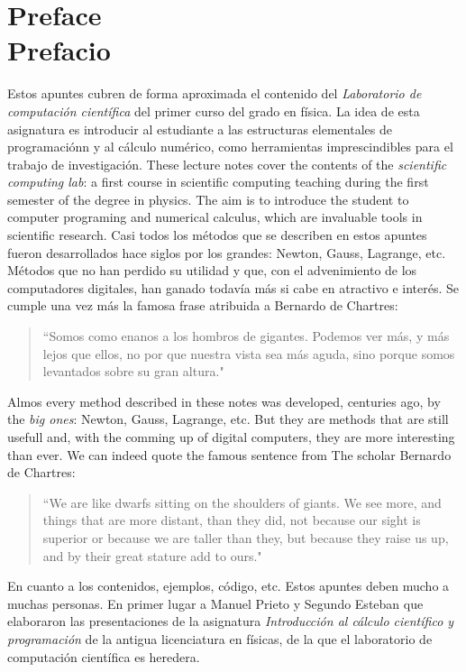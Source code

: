 \chapter*{Preface\\ Prefacio}
\begin{paracol}{2}
Estos apuntes cubren de forma aproximada  el contenido del \emph{Laboratorio de computación científica} del primer curso del grado en física.
La idea de esta asignatura es  introducir al estudiante a las estructuras elementales de programaciónn y al cálculo numérico, como herramientas imprescindibles para el trabajo de investigación.
\switchcolumn
These lecture notes cover the contents  of the \emph{scientific computing lab}: a first course in scientific computing teaching during the first semester of the degree in physics. The aim is to introduce the student to computer programing and numerical calculus, which are invaluable tools in scientific research.
\switchcolumn         
Casi todos los métodos que se describen en estos apuntes fueron desarrollados hace siglos por los grandes: Newton, Gauss, Lagrange, etc.  Métodos que no han perdido su utilidad y que, con el advenimiento de los computadores digitales, han ganado todavía más si cabe en atractivo e interés. Se cumple una vez más la famosa frase atribuida a Bernardo de Chartres:
\begin{quote}
``Somos como enanos a los hombros de gigantes. Podemos ver más, y más lejos que ellos, no por que nuestra vista sea más aguda, sino porque somos levantados sobre su gran altura."
\end{quote}
\switchcolumn
Almos every method described in these notes was developed, centuries ago, by the \emph{big ones}: Newton, Gauss, Lagrange, etc. But they are methods that are still usefull and, with the comming up of digital computers, they are more interesting than ever. We can indeed quote the famous sentence from The scholar Bernardo de Chartres:
\begin{quote}
``We are like dwarfs sitting on the shoulders of giants. We see more, and things that are more distant, than they did, not because our sight is superior or because we are taller than they, but because they raise us up, and by their great stature add to ours."
\end{quote}          

\switchcolumn
En cuanto a los contenidos, ejemplos, código, etc. Estos apuntes deben mucho a muchas personas. En primer lugar a Manuel Prieto y Segundo Esteban que elaboraron las presentaciones de la asignatura \emph{Introducción al cálculo científico y programación} de la antigua licenciatura en físicas, de la que el laboratorio de computación científica es heredera. 


\end{paracol}
